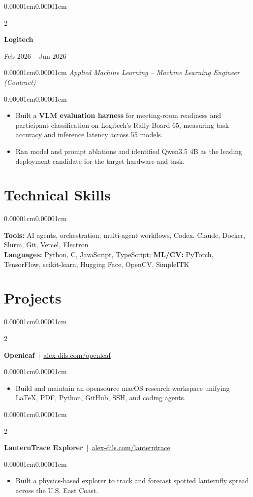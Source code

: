 \documentclass[10pt, letterpaper]{article}
\newenvironment{highlights}[1][18pt]{
  \begin{itemize}[topsep=0.04cm, parsep=0.02cm, partopsep=0pt, itemsep=0pt, leftmargin=#1]
}{
  \end{itemize}
}
\newenvironment{onecolentry}{
  \begin{adjustwidth}{0.00001cm}{0.00001cm}
}{
  \end{adjustwidth}
}
\newenvironment{twocolentry}[2][]{
  \onecolentry
  \def\secondColumn{#2}
  \setcolumnwidth{\fill,4.5cm}
  \begin{paracol}{2}
}{
  \switchcolumn \raggedleft \secondColumn
  \end{paracol}
  \endonecolentry
}
\newcommand{\experiencecompany}[1]{{\fontsize{10.5pt}{11.5pt}\selectfont\textbf{#1}}}
\newcommand{\experiencefocus}[1]{\begin{onecolentry}\small\textit{#1}\end{onecolentry}}
\begin{document}
\begin{twocolentry}{Feb 2026 -- Jun 2026}
    \experiencecompany{Logitech}
  \end{twocolentry}
  \experiencefocus{Applied Machine Learning -- Machine Learning Engineer (Contract)}
  \begin{onecolentry}
    \begin{highlights}
      \item Built a \textbf{VLM evaluation harness} for meeting-room readiness and participant classification on Logitech's Rally Board 65, measuring task accuracy and inference latency across 55 models.
      \item Ran model and prompt ablations and identified Qwen3.5 4B as the leading deployment candidate for the target hardware and task.
    \end{highlights}
  \end{onecolentry}

  \section{Technical Skills}
  \begin{onecolentry}
    \small \textbf{Tools:} AI agents, orchestration, multi-agent workflows, Codex, Claude, Docker, Slurm, Git, Vercel, Electron\\
    \textbf{Languages:} Python, C, JavaScript, TypeScript; \textbf{ML/CV:} PyTorch, TensorFlow, scikit-learn, Hugging Face, OpenCV, SimpleITK
  \end{onecolentry}

  \section{Projects}

  \begin{twocolentry}{2026}
    \textbf{Openleaf} \,|\, \href{https://www.alex-dils.com/openleaf}{alex-dils.com/openleaf}
  \end{twocolentry}
  \begin{onecolentry}
    \begin{highlights}
      \item Build and maintain an opensource macOS research workspace unifying LaTeX, PDF, Python, GitHub, SSH, and coding agents.
    \end{highlights}
  \end{onecolentry}

  \begin{twocolentry}{2026}
    \textbf{LanternTrace Explorer} \,|\, \href{https://www.alex-dils.com/lanterntrace}{alex-dils.com/lanterntrace}
  \end{twocolentry}
  \begin{onecolentry}
    \begin{highlights}
      \item Built a physics-based explorer to track and forecast spotted lanternfly spread across the U.S. East Coast.
    \end{highlights}
  \end{onecolentry}
\end{document}
